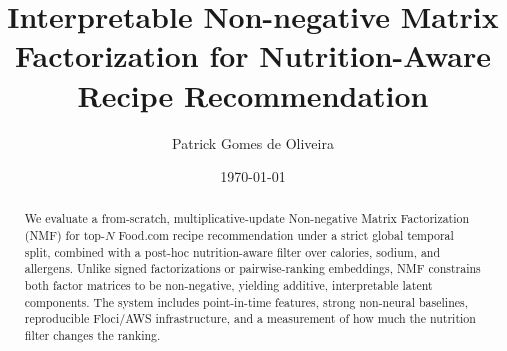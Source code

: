 \documentclass[10pt,twocolumn]{article}
\title{Interpretable Non-negative Matrix Factorization for Nutrition-Aware Recipe Recommendation}
\author{Patrick Gomes de Oliveira}
\date{\today}
\begin{document}
\maketitle
\begin{abstract}
We evaluate a from-scratch, multiplicative-update Non-negative Matrix
Factorization (NMF) for top-$N$ Food.com recipe recommendation under a
strict global temporal split, combined with a post-hoc nutrition-aware
filter over calories, sodium, and allergens. Unlike signed factorizations
or pairwise-ranking embeddings, NMF constrains both factor matrices to be
non-negative, yielding additive, interpretable latent components. The
system includes point-in-time features, strong non-neural baselines,
reproducible Floci/AWS infrastructure, and a measurement of how much the
nutrition filter changes the ranking.
\end{abstract}









\end{document}
